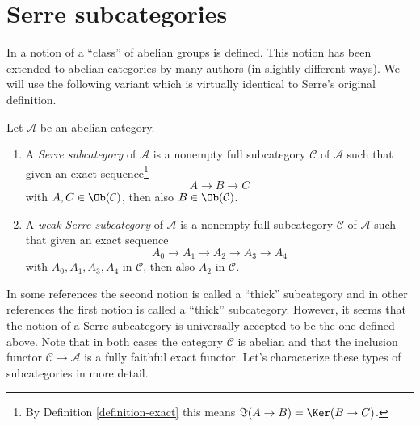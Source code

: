 \section{Serre subcategories}
\label{section-serre-subcategories}

\noindent
In \cite[Chapter I, Section 1]{Serre_homotopie_classes}
a notion of a ``class'' of abelian groups is defined.
This notion has been extended to abelian categories by many authors
(in slightly different ways). We will use the following variant
which is virtually identical to Serre's original definition.

\begin{definition}
\label{definition-serre-subcategory}
\begin{reference}
\cite[Condition (I) on page 259]{Serre_homotopie_classes}
\end{reference}
Let $\mathcal{A}$ be an abelian category.
\begin{enumerate}
\item A {\it Serre subcategory} of $\mathcal{A}$ is a
nonempty full subcategory $\mathcal{C}$ of $\mathcal{A}$
such that given an exact sequence\footnote{By
Definition \ref{definition-exact} this means $\Im(A \to B) = \Ker(B \to C)$.}
$$
A \to B \to C
$$
with $A, C \in \Ob(\mathcal{C})$, then also
$B \in \Ob(\mathcal{C})$.
\item A {\it weak Serre subcategory} of $\mathcal{A}$ is a nonempty
full subcategory $\mathcal{C}$ of $\mathcal{A}$ such that given an
exact sequence
$$
A_0 \to A_1 \to A_2 \to A_3 \to A_4
$$
with $A_0, A_1, A_3, A_4$ in $\mathcal{C}$, then also $A_2$ in $\mathcal{C}$.
\end{enumerate}
\end{definition}

\noindent
In some references the second notion is called a ``thick'' subcategory
and in other references the first notion is called a ``thick'' subcategory.
However, it seems that the notion of a Serre subcategory is universally
accepted to be the one defined above. Note that in both cases the category
$\mathcal{C}$ is abelian and that the inclusion functor
$\mathcal{C} \to \mathcal{A}$ is a fully faithful exact functor.
Let's characterize these types of subcategories in more detail.

